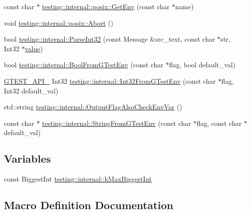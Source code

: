 \begin{DoxyCompactItemize}
const char $\ast$ \mbox{\hyperlink{namespacetesting_1_1internal_1_1posix_aa78973d3f7aa4efd24742b0537c8cd50}{testing\+::internal\+::posix\+::\+Get\+Env}} (const char $\ast$name)
\item 
void \mbox{\hyperlink{namespacetesting_1_1internal_1_1posix_a69b8278c59359dd6a6f941b4643db9fb}{testing\+::internal\+::posix\+::\+Abort}} ()
\item 
bool \mbox{\hyperlink{namespacetesting_1_1internal_ac06fc81336a3d80755f4020d34321766}{testing\+::internal\+::\+Parse\+Int32}} (const Message \&src\+\_\+text, const char $\ast$str, Int32 $\ast$\mbox{\hyperlink{_obj__test_2lib_2googletest-master_2googlemock_2test_2gmock-matchers__test_8cc_a337b8a670efc0b086ad3af163f3121b6}{value}})
\item 
bool \mbox{\hyperlink{namespacetesting_1_1internal_a67132cdce23fb71b6c38ee34ef81eb4c}{testing\+::internal\+::\+Bool\+From\+G\+Test\+Env}} (const char $\ast$flag, bool default\+\_\+val)
\item 
\mbox{\hyperlink{_obj__test_2lib_2googletest-release-1_88_81_2googletest_2include_2gtest_2internal_2gtest-port_8h_aa73be6f0ba4a7456180a94904ce17790}{G\+T\+E\+S\+T\+\_\+\+A\+P\+I\+\_\+}} Int32 \mbox{\hyperlink{namespacetesting_1_1internal_a0f7e728793f9e6cb0aa2b69eaa468bf3}{testing\+::internal\+::\+Int32\+From\+G\+Test\+Env}} (const char $\ast$flag, Int32 default\+\_\+val)
\item 
std\+::string \mbox{\hyperlink{namespacetesting_1_1internal_a0c793c6d84760d900299916c077a1af4}{testing\+::internal\+::\+Output\+Flag\+Also\+Check\+Env\+Var}} ()
\item 
const char $\ast$ \mbox{\hyperlink{namespacetesting_1_1internal_a7ed785df46a339403b0f749d3a879201}{testing\+::internal\+::\+String\+From\+G\+Test\+Env}} (const char $\ast$flag, const char $\ast$default\+\_\+val)
\end{DoxyCompactItemize}
\subsection*{Variables}
\begin{DoxyCompactItemize}
\item 
const Biggest\+Int \mbox{\hyperlink{namespacetesting_1_1internal_ad901880198832bc166d2493096b451f7}{testing\+::internal\+::k\+Max\+Biggest\+Int}}
\end{DoxyCompactItemize}


\subsection{Macro Definition Documentation}
\mbox{\label{googletest-master_2googletest_2include_2gtest_2internal_2gtest-port_8h_ab389953fc1f7e4efae30d182a0e0a13b}} 
